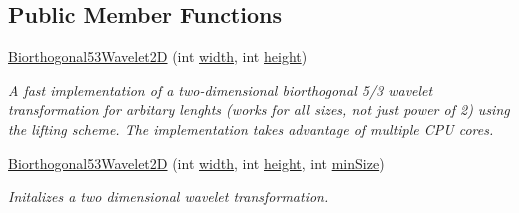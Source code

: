 \subsection*{\-Public \-Member \-Functions}
\begin{DoxyCompactItemize}
\item 
\hyperlink{class_turbo_wavelets_1_1_biorthogonal53_wavelet2_d_a8783eb5b8e032cd8cf75c5a1bb80bba0}{\-Biorthogonal53\-Wavelet2\-D} (int \hyperlink{class_turbo_wavelets_1_1_wavelet2_d_aaa4b3711957fe1798980e6891331a08d}{width}, int \hyperlink{class_turbo_wavelets_1_1_wavelet2_d_afb2aa87b89b82f329357cbdc0cde18a8}{height})
\begin{DoxyCompactList}\small\item\em \-A fast implementation of a two-\/dimensional biorthogonal 5/3 wavelet transformation for arbitary lenghts (works for all sizes, not just power of 2) using the lifting scheme. \-The implementation takes advantage of multiple \-C\-P\-U cores. \end{DoxyCompactList}\item 
\hyperlink{class_turbo_wavelets_1_1_biorthogonal53_wavelet2_d_a2d9bf97c2211d5859b3a53835bea7888}{\-Biorthogonal53\-Wavelet2\-D} (int \hyperlink{class_turbo_wavelets_1_1_wavelet2_d_aaa4b3711957fe1798980e6891331a08d}{width}, int \hyperlink{class_turbo_wavelets_1_1_wavelet2_d_afb2aa87b89b82f329357cbdc0cde18a8}{height}, int \hyperlink{class_turbo_wavelets_1_1_wavelet2_d_af5148ef1a46dd5694ccea13aa8f1b9e2}{min\-Size})
\begin{DoxyCompactList}\small\item\em \-Initalizes a two dimensional wavelet transformation. \end{DoxyCompactList}\end{DoxyCompactItemize}
